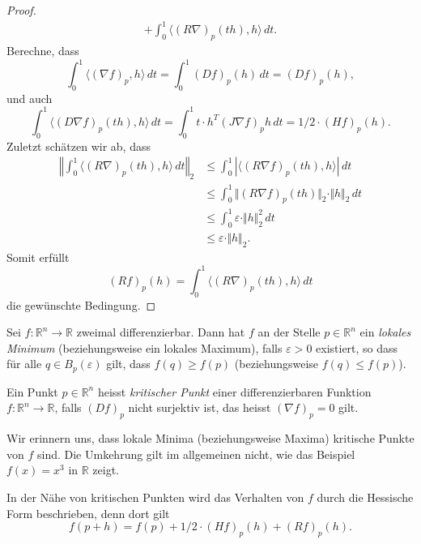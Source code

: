 \documentclass[../main.tex]{subfiles}
\begin{document}
\begin{proof}
\begin{align*}
    + \int_{0}^{1} \langle {(R \nabla )}_p (th), h \rangle \, dt.
  \end{align*}
  Berechne, dass
  \[
    \int_{0}^{1} \langle {(\nabla f)}_p , h \rangle \, dt
    = \int_{0}^{1} {(Df)}_p(h) \, dt = {(Df)}_p (h),
  \]
  und auch
  \[
     \int_{0}^{1} \langle {(D \nabla f)}_p (th), h \rangle \, dt
     = \int_{0}^{1} t \cdot h^T {(J \nabla f)}_p h \, dt
     = 1/2 \cdot {(Hf)}_p(h).
  \]
  Zuletzt schätzen wir ab, dass
  \begin{align*}
    \left\Vert \int_{0}^{1} \langle {(R \nabla )}_p (th), h \rangle \, dt \right\Vert_2
    &\leq \int_{0}^{1} | \langle {(R \nabla f)}_p (th), h \rangle | \, dt  \\
    &\leq \int_{0}^{1} \Vert {(R \nabla f)}_p (th) \Vert_2
    \cdot \Vert h \Vert_2 \, dt \\
    &\leq \int_{0}^{1} \varepsilon \cdot \Vert h \Vert_2^2 \, dt \\
    &\leq \varepsilon \cdot \Vert h \Vert_2.
  \end{align*}
  Somit erfüllt
  \[
    {(Rf)}_p(h) = \int_{0}^{1} \langle {(R \nabla )}_p (th), h \rangle \, dt
  \]
  die gewünschte Bedingung.
\end{proof}

Sei $f \colon \mathbb{R}^n \to \mathbb{R}$ zweimal differenzierbar.
Dann hat $f$ an der Stelle $p \in \mathbb{R}^n$ 
ein \emph{lokales Minimum} (beziehungsweise ein lokales Maximum),
falls $\varepsilon > 0$ existiert, so dass für
alle $q \in B_p( \varepsilon)$ gilt, dass
$f(q) \geq f(p)$ (beziehungsweise $f(q) \leq f(p)$).

\begin{definition}
  Ein Punkt $p \in \mathbb{R}^n$ heisst \emph{kritischer Punkt}
  einer differenzierbaren Funktion $f \colon \mathbb{R}^n \to \mathbb{R}$, 
  falls
  ${(Df)}_p$ nicht surjektiv ist, das heisst
  ${(\nabla f)}_p = 0$ gilt.
\end{definition}

\begin{remark}
  Wir erinnern uns, dass lokale Minima (beziehungsweise Maxima)
  kritische Punkte von $f$ sind. Die Umkehrung gilt im 
  allgemeinen nicht, wie das Beispiel
  $f(x) = x^3$ in $\mathbb{R}$ zeigt.
\end{remark}

In der Nähe von kritischen Punkten wird
das Verhalten von $f$ durch die Hessische
Form beschrieben, denn dort gilt
\[
  f(p + h) = f(p) + 1/2 \cdot {(Hf)}_p(h) + {(Rf)}_p(h).
\]
\end{document}
